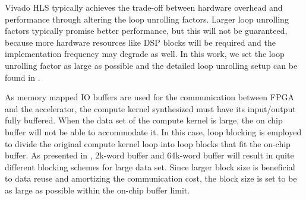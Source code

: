 Vivado HLS typically achieves the trade-off between hardware overhead and performance through altering the loop unrolling factors. Larger loop unrolling factors typically promise better performance, but this will not be guaranteed, because more hardware resources like DSP blocks will be required and the implementation frequency may degrade as well. In this work, we set the loop unrolling factor as large as possible and the detailed loop unrolling setup can be found in .

As memory mapped IO buffers are used for the communication between FPGA and the accelerator, the compute kernel synthesized must have its input/output fully buffered. When the data set of the compute kernel is large, the on chip buffer will not be able to accommodate it. In this case, loop blocking is employed to divide the original compute kernel loop into loop blocks that fit the on-chip buffer. As presented in , 2k-word buffer and 64k-word buffer will result in quite different blocking schemes for large data set. Since larger block size is beneficial to data reuse and amortizing the communication cost, the block size is set to be as large as possible within the on-chip buffer limit.

